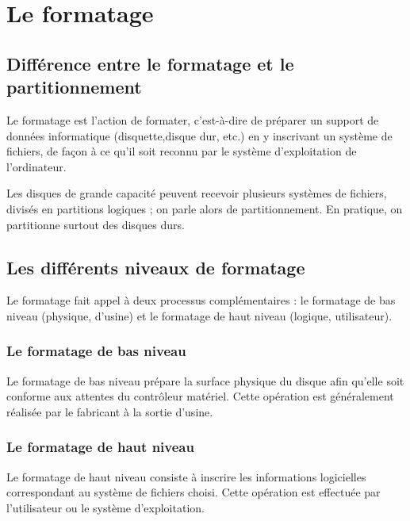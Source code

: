 \chapter{Le formatage}
	\section{Différence entre le formatage et le partitionnement}
Le formatage est l'action de formater, c'est-à-dire de préparer un support de données informatique (disquette,disque dur, etc.) en y inscrivant un système de fichiers, de façon à ce qu'il soit reconnu par le système d'exploitation de l'ordinateur.
\par Les disques de grande capacité peuvent recevoir plusieurs systèmes de fichiers, divisés en partitions logiques ; on parle alors de partitionnement. En pratique, on partitionne surtout des disques durs.


\section{Les différents niveaux de formatage}

Le formatage fait appel à deux processus complémentaires : le formatage de bas niveau (physique, d'usine) et le formatage de haut niveau (logique, utilisateur).

\subsection{Le formatage de bas niveau}
Le formatage de bas niveau prépare la surface physique du disque afin qu'elle soit conforme aux attentes du contrôleur matériel. Cette opération est généralement réalisée par le fabricant à la sortie d'usine.

\subsection{Le formatage de haut niveau}
Le formatage de haut niveau consiste à inscrire les informations logicielles correspondant au système de fichiers choisi. Cette opération est effectuée par l'utilisateur ou le système d'exploitation.